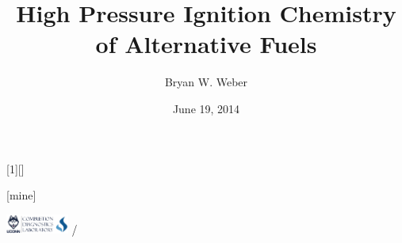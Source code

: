 \usepackage{xmpincl}

\title{High Pressure Ignition Chemistry of Alternative Fuels}
\author{Bryan W. Weber}
\date{June 19, 2014}

\usepackage{lmodern}

\AtBeginSection{\frame{\sectionpage}}

[1][]{%
}
[mine]

\usepackage{pgfplots}
\pgfplotsset{compat=1.10}
\usetikzlibrary{decorations.pathreplacing,calc,decorations.text}

\newcommand{\arcarrow}[9]%
{   \pgfmathsetmacro{\rin}{#1}
    \pgfmathsetmacro{\rmid}{#2}
    \pgfmathsetmacro{\rout}{#3}
    \pgfmathsetmacro{\astart}{#4}
    \pgfmathsetmacro{\aend}{#5}
    \pgfmathsetmacro{\atip}{#6}
    \fill[#7] (\astart:\rin) arc (\astart:\aend:\rin) -- (\aend+\atip:\rmid) -- (\aend:\rout) arc (\aend:\astart:\rout) -- (\astart+\atip:\rmid) -- cycle;
    \path[decoration={text along path, text={#8}, text color={#9}, text align={align=center}, raise=-0.5ex},decorate] (\astart+\atip:\rmid) arc (\astart+\atip:\aend+\atip:\rmid);
}

\newcommand{\tikzmark}[1]{\tikz[overlay,remember picture] \coordinate (#1);}

\beamertemplatenavigationsymbolsempty

{%
\begin{beamercolorbox}[sep=2mm]{}
\includegraphics[height=0.25in]{logo}
\hfill
{\color{gray}\insertpagenumber{}/\insertpresentationendpage}
\end{beamercolorbox}
}%

\graphicspath{ {figures/} }

\usepackage[absolute,overlay]{textpos}

\usepackage{siunitx}
